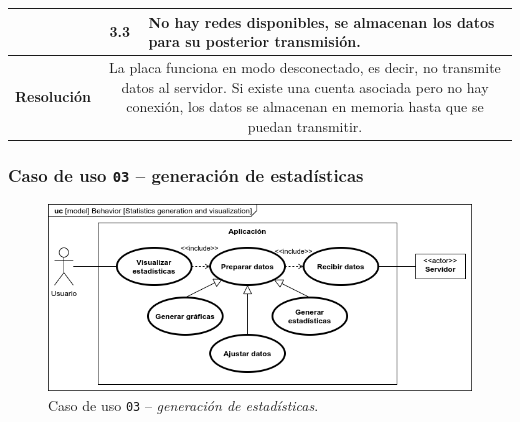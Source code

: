 \begin{table}[H]
\begin{tabularx}{\textwidth}{|c|c|X|}
    \cline{2-3}
                                                & 3.3                                                                                                                                                                                                                          & \multicolumn{1}{L|}{No hay redes disponibles, se almacenan los datos para su posterior transmisión.}                                                         \\
    \hline\hline
    \textbf{Resolución}                         & \multicolumn{2}{X|}{La placa funciona en modo desconectado, es decir, no transmite datos al servidor. Si existe una cuenta asociada pero no hay conexión, los datos se almacenan en memoria hasta que se puedan transmitir.}                                                                                                                                                                \\
    \hline
  \end{tabularx}
\end{table}

\subsubsection{Caso de uso \texttt{03} -- generación de estadísticas}

\begin{figure}[H]
  \centering
  \includegraphics[width=\linewidth]{diagrams/UseCases-UC3 - stats.png}
  \caption{Caso de uso \texttt{03} -- \textit{generación de estadísticas}.}
  \label{uc:stats}
\end{figure}


